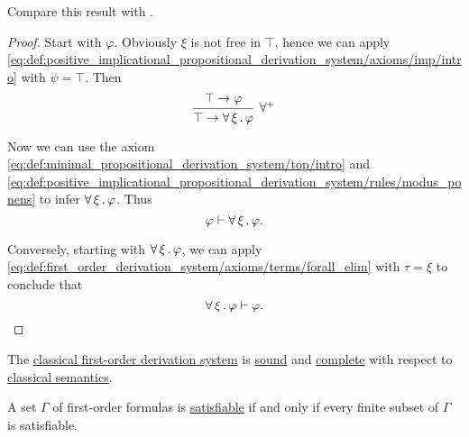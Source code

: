 \begin{proposition}
\begin{proposition}
\begin{proposition}
  Compare this result with .
\end{proposition}
\begin{proof}
  Start with \( \varphi \). Obviously \( \xi \) is not free in \( \top \), hence we can apply \eqref{eq:def:positive_implicational_propositional_derivation_system/axioms/imp/intro} with \( \psi = \top \). Then
  \begin{equation*}
    \begin{prooftree}
      \hypo{\top \rightarrow \varphi}
      \infer1[\( \forall^+ \)]{\top \rightarrow \qforall \xi \varphi}
    \end{prooftree}
  \end{equation*}

  Now we can use the axiom \eqref{eq:def:minimal_propositional_derivation_system/top/intro} and \eqref{eq:def:positive_implicational_propositional_derivation_system/rules/modus_ponens} to infer \( \forall \thinspace \xi \thinspace . \thinspace \varphi \). Thus
  \begin{equation*}
    \varphi \vdash \forall \thinspace \xi \thinspace . \thinspace \varphi.
  \end{equation*}

  Conversely, starting with \( \forall \thinspace \xi \thinspace . \thinspace \varphi \), we can apply \eqref{eq:def:first_order_derivation_system/axioms/terms/forall_elim} with \( \tau = \xi \) to conclude that
  \begin{equation*}
    \forall \thinspace \xi \thinspace . \thinspace \varphi \vdash \varphi.
  \end{equation*}
\end{proof}

\begin{theorem}\label{thm:classical_first_order_logic_is_sound_and_complete}
  The \hyperref[def:first_order_derivation_system]{classical first-order derivation system} is \hyperref[def:derivability_and_satisfiability/soundness]{sound} and \hyperref[def:derivability_and_satisfiability/completeness]{complete} with respect to \hyperref[def:first_order_semantics]{classical semantics}.
\end{theorem}

\smallskip

\begin{corollary}\label{thm:first_order_compactness_theorem}
  A set \( \Gamma \) of first-order formulas is \hyperref[def:propositional_semantics/satisfiability]{satisfiable} if and only if every finite subset of \( \Gamma \) is satisfiable.
\end{corollary}


\end{proposition}
\end{proposition}
